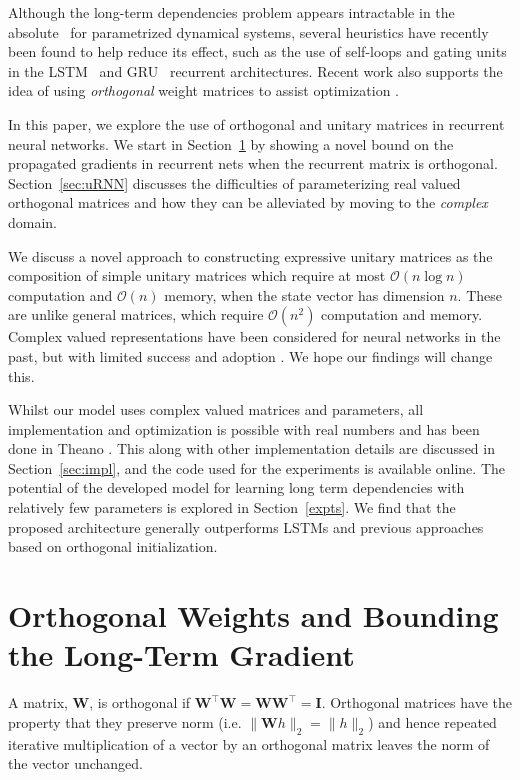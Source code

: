 \documentclass{article} %
\newcommand{\matr}[1]{\mathbf{#1}}
\begin{document}
Although the long-term dependencies problem appears intractable in the absolute~\citep{Yoshua94} for
parametrized dynamical systems, several heuristics have recently been found to help 
reduce its effect, such as the use of self-loops and gating units in the LSTM~\citep{LSTM}
and GRU~\citep{Cho2014a} recurrent architectures.
Recent work also supports the idea of using \textit{orthogonal} weight matrices to assist optimization  
\citep{Saxe2014, Quoc2015}.


In this paper, we explore the use of orthogonal and unitary matrices in recurrent neural networks.
We start in Section~\ref{sec:ortho} by showing a novel bound on the propagated gradients
in recurrent nets when the recurrent matrix is orthogonal.
Section~\ref{sec:uRNN} discusses the difficulties of parameterizing real valued orthogonal matrices and how
they can be alleviated by moving to the \textit{complex} domain. 

We discuss a novel approach to constructing expressive unitary matrices as the composition of simple
unitary matrices which require at most $\mathcal{O}(n \log n)$ computation and $\mathcal{O}(n)$ memory,
when the state vector has dimension $n$. These are
unlike general matrices, which require $\mathcal{O}(n^2)$ computation and memory. 
Complex valued representations have been considered for neural networks in the past, 
but with limited success and adoption \citep{hirose2003complex, zimmermann2011comparison}. 
We hope our findings will change this.

Whilst our model uses complex valued matrices and parameters, all
implementation and optimization is possible with real numbers and has been
done in Theano \citep{Fred2010}. This along with other implementation details are discussed
in Section~\ref{sec:impl}, and the code used for the experiments is available online.
The potential of the developed model for learning long term dependencies
with relatively few parameters is explored in Section~\ref{expts}. 
We find that the proposed architecture generally outperforms LSTMs and previous
approaches based on orthogonal initialization.

\section{Orthogonal Weights and Bounding the Long-Term Gradient}
\label{sec:ortho}

A matrix, $\matr{W}$, is orthogonal if 
$\matr{W}^\top \matr{W} = \matr{W} \matr{W}^\top = \matr{I}$. 
Orthogonal matrices have the property that they preserve norm (i.e. $\| \matr{W} h \|_2 = \| h \|_2$)
and hence repeated iterative multiplication of a vector by an orthogonal matrix leaves the norm of the 
vector unchanged.
\end{document}
